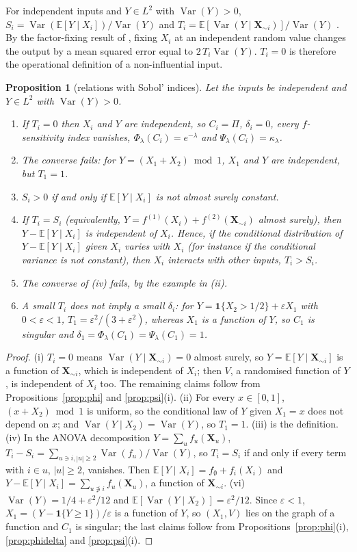 \documentclass[11pt,a4paper]{article}
\newtheorem{proposition}[theorem]{Proposition}
\theoremstyle{definition}
\theoremstyle{remark}
\newcommand{\E}{\mathbb{E}}
\newcommand{\Var}{\operatorname{Var}}
\newcommand{\ind}{\mathbf{1}}
\newcommand{\bX}{\mathbf{X}}
\begin{document}
For independent inputs and $Y\in L^2$ with $\Var(Y)>0$, $S_i=\Var(\E[Y\mid X_i])/\Var(Y)$ and $T_i=\E[\Var(Y\mid\bX_{\sim i})]/\Var(Y)$ \citep{homma1996,saltelli2008}. By the factor-fixing result of \citet{sobol2001}, fixing $X_i$ at an independent random value changes the output by a mean squared error equal to $2\,T_i\Var(Y)$. $T_i=0$ is therefore the operational definition of a non-influential input.

\begin{proposition}[relations with Sobol' indices]\label{prop:sobol}
Let the inputs be independent and $Y\in L^2$ with $\Var(Y)>0$.
\begin{enumerate}[label=(\roman*)]
\item If $T_i=0$ then $X_i$ and $Y$ are independent, so $C_i=\Pi$, $\delta_i=0$, every $f$-sensitivity index vanishes, $\Phi_\lambda(C_i)=e^{-\lambda}$ and $\Psi_\lambda(C_i)=\kappa_\lambda$.
\item The converse fails: for $Y=(X_1+X_2)\bmod1$, $X_1$ and $Y$ are independent, but $T_1=1$.
\item $S_i>0$ if and only if $\E[Y\mid X_i]$ is not almost surely constant.
\item If $T_i=S_i$ (equivalently, $Y=f^{(1)}(X_i)+f^{(2)}(\bX_{\sim i})$ almost surely), then $Y-\E[Y\mid X_i]$ is independent of $X_i$. Hence, if the conditional distribution of $Y-\E[Y\mid X_i]$ given $X_i$ varies with $X_i$ (for instance if the conditional variance is not constant), then $X_i$ interacts with other inputs, $T_i>S_i$.
\item The converse of (iv) fails, by the example in (ii).
\item A small $T_i$ does not imply a small $\delta_i$: for $Y=\ind\{X_2>1/2\}+\varepsilon X_1$ with $0<\varepsilon<1$, $T_1=\varepsilon^2/(3+\varepsilon^2)$, whereas $X_1$ is a function of $Y$, so $C_1$ is singular and $\delta_1=\Phi_\lambda(C_1)=\Psi_\lambda(C_1)=1$.
\end{enumerate}
\end{proposition}

\begin{proof}
(i) $T_i=0$ means $\Var(Y\mid\bX_{\sim i})=0$ almost surely, so $Y=\E[Y\mid\bX_{\sim i}]$ is a function of $\bX_{\sim i}$, which is independent of $X_i$; then $V$, a randomised function of $Y$, is independent of $X_i$ too. The remaining claims follow from Propositions~\ref{prop:phi} and \ref{prop:psi}(i). (ii) For every $x\in[0,1]$, $(x+X_2)\bmod1$ is uniform, so the conditional law of $Y$ given $X_1=x$ does not depend on $x$; and $\Var(Y\mid X_2)=\Var(Y)$, so $T_1=1$. (iii) is the definition. (iv) In the ANOVA decomposition $Y=\sum_uf_u(\bX_u)$, $T_i-S_i=\sum_{u\ni i,|u|\ge2}\Var(f_u)/\Var(Y)$, so $T_i=S_i$ if and only if every term with $i\in u$, $|u|\ge2$, vanishes. Then $\E[Y\mid X_i]=f_\emptyset+f_i(X_i)$ and $Y-\E[Y\mid X_i]=\sum_{u\not\ni i}f_u(\bX_u)$, a function of $\bX_{\sim i}$. (vi) $\Var(Y)=1/4+\varepsilon^2/12$ and $\E[\Var(Y\mid X_2)]=\varepsilon^2/12$. Since $\varepsilon<1$, $X_1=(Y-\ind\{Y\ge1\})/\varepsilon$ is a function of $Y$, so $(X_1,V)$ lies on the graph of a function and $C_1$ is singular; the last claims follow from Propositions~\ref{prop:phi}(i), \ref{prop:phidelta} and \ref{prop:psi}(i).
\end{proof}
\end{document}
